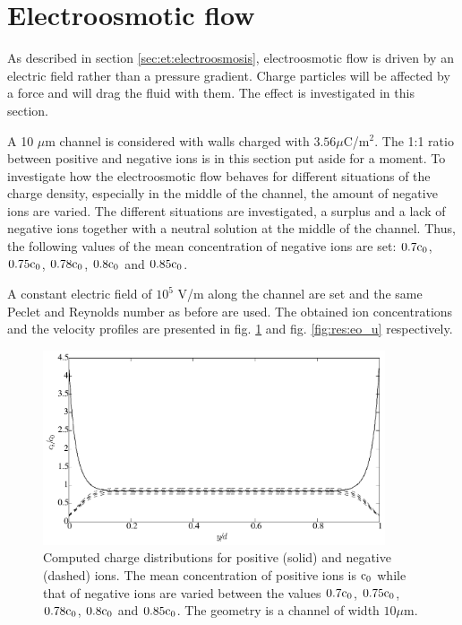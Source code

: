 \section{Electroosmotic flow}
As described in section \ref{sec:et:electroosmosis}, electroosmotic
flow is driven by an electric field rather than a pressure gradient.
Charge particles will be affected by a force and will drag the fluid
with them. The effect is investigated in this section.

A 10 $\mu$m channel is considered with walls charged with $3.56
\mu$C/m$^2$. The 1:1 ratio between positive and negative ions is in
this section put aside for a moment. To investigate how the
electroosmotic flow behaves for different situations of the charge
density, especially in the middle of the channel, the amount of
negative ions are varied. The different situations are investigated, a
surplus and a lack of negative ions together with a neutral solution
at the middle of the channel. Thus, the following values of the mean
concentration of negative ions are set: $0.7\mathrm{c}_0$, $0.75\mathrm{c}_0$,
$0.78\mathrm{c}_0$, $0.8\mathrm{c}_0$ and $0.85\mathrm{c}_0$. 

A constant electric field of $10^5$ V/m along the channel are set
and the same Peclet and Reynolds number as before are used. The
obtained ion concentrations and the velocity profiles are presented in
fig. \ref{fig:res:eo_charge} and fig. \ref{fig:res:eo_u}
respectively. 

\begin{figure}
\begin{center}
\includegraphics[width=0.9\textwidth]{fig/eo_conc.pdf}
\end{center}
\caption{Computed charge distributions for positive (solid) and
  negative (dashed) ions. The mean concentration of positive ions is
  $\mathrm{c}_0$ while that of negative ions are varied between the values
  $0.7\mathrm{c}_0$, $0.75\mathrm{c}_0$, $0.78\mathrm{c}_0$, $0.8\mathrm{c}_0$ and $0.85\mathrm{c}_0$. The
  geometry is a channel of width $10 \mu$m.}
\label{fig:res:eo_charge}
\end{figure}


